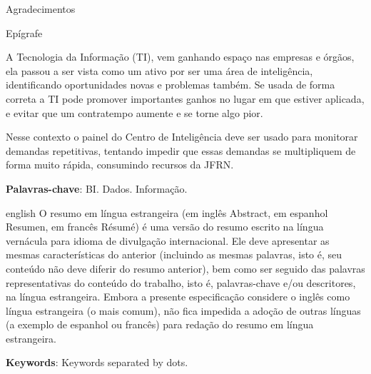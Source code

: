 \documentclass[
    12pt,				%
	oneside,            %
	a4paper,			%
	english,			%
	french,
	spanish,
	brazil				%
	]{abntex2}
\begin{document}
\begin{agradecimentos}
Agradecimentos
\end{agradecimentos}

\begin{epigrafe}
    \vspace*{\fill}
	\begin{flushright}
		Epígrafe
	\end{flushright}
\end{epigrafe}

\setlength{\absparsep}{18pt} %
\begin{resumo}
\vspace{\onelineskip}

A Tecnologia da Informação (TI), vem ganhando espaço nas empresas e órgãos, ela passou a ser vista como um ativo por ser uma área de inteligência, identificando oportunidades novas e problemas também. Se usada de forma correta a TI pode promover importantes ganhos no lugar em que estiver aplicada, e evitar que um contratempo aumente e se torne algo pior. 

Nesse contexto o painel do Centro de Inteligência deve ser usado para monitorar demandas repetitivas, tentando impedir que essas demandas se multipliquem de forma muito rápida, consumindo recursos da JFRN.

\noindent\textbf{Palavras-chave}: BI. Dados. Informação.
\end{resumo}

\begin{resumo}[Abstract]
\vspace{\onelineskip}
\begin{otherlanguage*}{english}
O resumo em língua estrangeira (em inglês Abstract, em espanhol Resumen, em francês Résumé) é uma versão do resumo escrito na língua vernácula para idioma de divulgação internacional. Ele deve apresentar as mesmas características do anterior (incluindo as mesmas palavras, isto é, seu conteúdo não deve diferir do resumo anterior), bem como ser seguido das palavras representativas do conteúdo do trabalho, isto é, palavras-chave e/ou descritores, na língua estrangeira. Embora a presente especificação considere o inglês como língua estrangeira (o mais comum), não fica impedida a adoção de outras línguas (a exemplo de espanhol ou francês) para redação do resumo em língua estrangeira.

\noindent\textbf{Keywords}: Keywords separated by dots.
\end{otherlanguage*}
\end{resumo}
\end{document}
